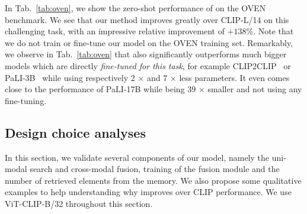 In Tab.~\ref{tab:oven}, we show the zero-shot performance of \OURS on the OVEN benchmark.
We see that our method improves greatly over CLIP-L/14 on this challenging task, with an impressive relative improvement of $+138\%$.
Note that we do not train or fine-tune our model on the OVEN training set. 
Remarkably, we observe in Tab.~\ref{tab:oven} that \OURS also significantly outperforms much bigger models which are directly \emph{fine-tuned for this task}, for example CLIP2CLIP~\cite{hu2023open} or PaLI-3B~\cite{pali2022} while using respectively 2 $\times$ and 7 $\times$ less parameters.
It even comes close to the performance of PaLI-17B while being 39 $\times$ smaller and not using any fine-tuning.



\subsection{Design choice analyses}
\vspace{-0.2cm}
In this section, we validate several components of our model, namely the uni-modal search and cross-modal fusion, training of the fusion module and the number of retrieved elements from the memory.
We also propose some qualitative examples to help understanding why \OURS improves over CLIP performance.
We use ViT-CLIP-B/32 throughout this section.

